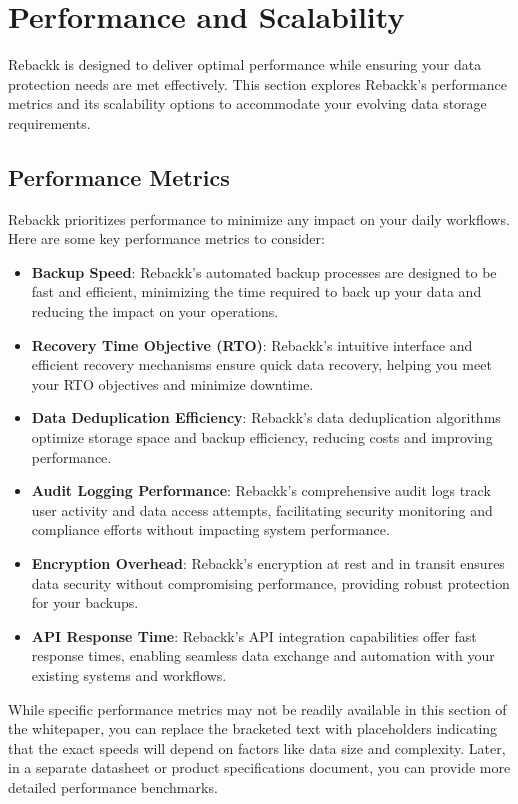 \documentclass[12pt]{article}
\begin{document}
\section{Performance and Scalability}
Rebackk is designed to deliver optimal performance while ensuring your data protection needs are met effectively. This section explores Rebackk's performance metrics and its scalability options to accommodate your evolving data storage requirements. 

\subsection{Performance Metrics}
Rebackk prioritizes performance to minimize any impact on your daily workflows. Here are some key performance metrics to consider:

\begin{itemize}
    \item \textbf{Backup Speed}: Rebackk's automated backup processes are designed to be fast and efficient, minimizing the time required to back up your data and reducing the impact on your operations.
    \item \textbf{Recovery Time Objective (RTO)}: Rebackk's intuitive interface and efficient recovery mechanisms ensure quick data recovery, helping you meet your RTO objectives and minimize downtime.
    \item \textbf{Data Deduplication Efficiency}: Rebackk's data deduplication algorithms optimize storage space and backup efficiency, reducing costs and improving performance.
    \item \textbf{Audit Logging Performance}: Rebackk's comprehensive audit logs track user activity and data access attempts, facilitating security monitoring and compliance efforts without impacting system performance.
    \item \textbf{Encryption Overhead}: Rebackk's encryption at rest and in transit ensures data security without compromising performance, providing robust protection for your backups.
    \item \textbf{API Response Time}: Rebackk's API integration capabilities offer fast response times, enabling seamless data exchange and automation with your existing systems and workflows.
\end{itemize}
While specific performance metrics may not be readily available in this section of the whitepaper, you can replace the bracketed text with placeholders indicating that the exact speeds will depend on factors like data size and complexity. Later, in a separate datasheet or product specifications document, you can provide more detailed performance benchmarks.
\end{document}
